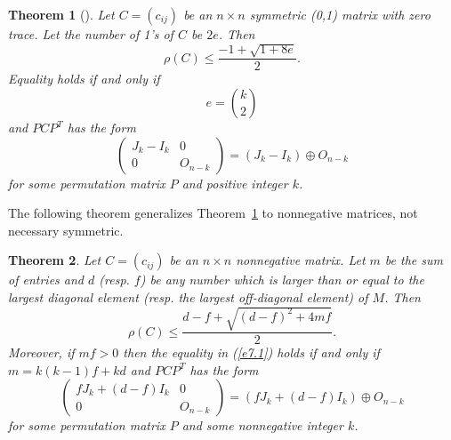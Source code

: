 \documentclass[final,3p, times, 12pt]{elsarticle}
\theoremstyle{plain}
\newtheorem{thm}{Theorem}[section]
\theoremstyle{definition}
\theoremstyle{remark}
\numberwithin{equation}{section}
\begin{document}
\begin{thm}[\cite{s87}]\label{t6.1s}
Let $C=(c_{ij})$ be an $n\times n$ symmetric (0,1) matrix with zero trace. Let the number of 1's of $C$ be $2e$. Then
$$\rho(C)\leq \frac{-1+\sqrt{1+8e}}{2}.$$
Equality holds if and only if
$$e=\binom{k}{2}$$
and $PCP^T$ has the form
$$
\left(
\begin{matrix}
J_k-I_k & 0 \\
0   & O_{n-k}
\end{matrix}
\right)=(J_k-I_k)\oplus O_{n-k}
$$
for some permutation matrix $P$ and positive integer $k$.
\end{thm}


The following theorem generalizes Theorem~\ref{t6.1s} to nonnegative matrices, not necessary symmetric.
\begin{thm}\label{tt6.1}
Let $C=(c_{ij})$ be an $n\times n$ nonnegative matrix. Let $m$ be the sum of entries
and $d$ (resp. $f$) be any number which is larger than or equal to the largest diagonal element (resp. the largest off-diagonal element) of $M$.
Then
 \begin{equation}\label{e7.1}
\rho(C)\leq \frac{d-f+\sqrt{(d-f)^2+4mf}}{2}.
\end{equation}
Moreover, if $mf>0$ then the equality in (\ref{e7.1}) holds
 if and only if
 $m=k(k-1)f+kd$ and
 $PCP^T$ has the form
 $$\begin{pmatrix}
 fJ_k+(d-f)I_k & 0\\
 0   & O_{n-k}
 \end{pmatrix}=
 (fJ_k+(d-f)I_k)\oplus O_{n-k}$$   for some permutation matrix $P$ and some  nonnegative integer $k$.
\end{thm}
\end{document}

